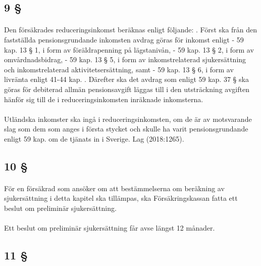 \documentclass[a4paper,notitlepage,openany,10pt]{book}
\begin{document}
\subsection*{9 §}
\paragraph*{}
Den försäkrades reduceringsinkomst beräknas enligt följande:
. Först ska från den fastställda pensionsgrundande inkomsten avdrag göras för inkomst enligt
\newline - 59 kap. 13 § 1, i form av föräldrapenning på lägstanivån,
\newline - 59 kap. 13 § 2, i form av omvårdnadsbidrag,
\newline - 59 kap. 13 § 5, i form av inkomstrelaterad sjukersättning och inkomstrelaterad aktivitetsersättning, samt
\newline - 59 kap. 13 § 6, i form av livränta enligt 41-44 kap.
. Därefter ska det avdrag som enligt 59 kap. 37 § ska göras för debiterad allmän pensionsavgift läggas till i den utsträckning avgiften hänför sig till de i reduceringsinkomsten inräknade inkomsterna.
\paragraph*{}
Utländska inkomster ska ingå i reduceringsinkomsten, om de är av motsvarande slag som dem som anges i första stycket och skulle ha varit pensionsgrundande enligt 59 kap. om de tjänats in i Sverige.
Lag (2018:1265).
\subsection*{10 §}
\paragraph*{}
För en försäkrad som ansöker om att bestämmelserna om beräkning av sjukersättning i detta kapitel ska tillämpas, ska Försäkringskassan fatta ett beslut om preliminär sjukersättning.
\paragraph*{}
Ett beslut om preliminär sjukersättning får avse längst 12 månader.
\subsection*{11 §}
\end{document}
